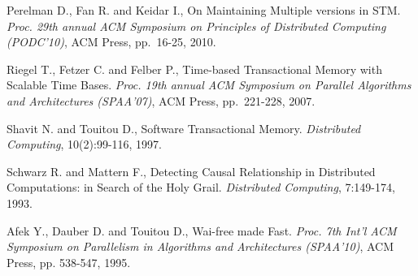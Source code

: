 \begin{thebibliography}{99}
{%



Perelman D., Fan R. and Keidar I., 
On Maintaining Multiple versions in STM. 
{\em  Proc.   29th  annual  ACM    Symposium  on Principles  of Distributed
Computing (PODC'10)}, ACM Press, pp.~16-25, 2010. 




Riegel T., Fetzer C. and Felber P.,
Time-based Transactional Memory with Scalable Time Bases.
{\em  Proc.   19th  annual  ACM   Symposium  on  Parallel   Algorithms  and
Architectures (SPAA'07)}, ACM Press, pp.~221-228, 2007.


Shavit N. and Touitou D., 
Software Transactional Memory. 
{\it Distributed  Computing}, 10(2):99-116, 1997. 


% 
% 
% 
% 
% 



Schwarz R. and Mattern F., 
Detecting  Causal Relationship in Distributed  Computations: in  Search of
the Holy Grail. 
{\it Distributed Computing}, 7:149-174, 1993. 



Afek Y., Dauber D. and Touitou D.,
Wai-free made Fast. 
{\it Proc. 7th  Int'l  ACM Symposium on Parallelism in Algorithms 
and Architectures   (SPAA'10)},  ACM Press, pp. 538-547,  1995. 


}
\end{thebibliography}
